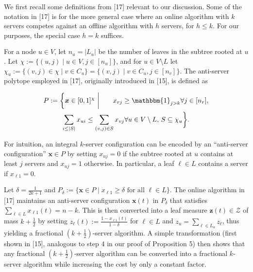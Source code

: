 We first recall some definitions from [17] relevant to our discussion.
Some of the notation in [17] is for the more general case where an online algorithm with $k$ servers competes against an offline algorithm with $h$ servers, for $h\leq k$. For our purposes, the special case $h=k$ suffices.\par




For a node $u\in V$, let $n_{u}=|L_{u}|$ be the number of leaves in the subtree rooted at $u$. Let $\chi:=\{(u,j)\mid u\in V,j\in[n_{u}]\}$, and for $u\in V\setminus L$ let $\chi_{u}:=\{(v,j)\in\chi\mid v\in C_{u}\}=\{(v,j)\mid v\in C_{u},j\in[n_{v}]\}$. The anti-server polytope employed in [17], originally introduced in [15], is defined as\par


\[\begin{gathered}
\displaystyle P:=\bigg\{{\boldsymbol{x}}\in[0,1]^{\chi}\,\,\bigg|\qquad x_{rj} \displaystyle\geq\mathbbm{1}_{j>k} \displaystyle\forall j\in[n_{r}], \\
\displaystyle\sum_{i\leq|S|}x_{ui} \displaystyle\leq\sum_{(v,j)\in S}x_{vj} \displaystyle\forall u\in V\setminus L,\,S\subseteq\chi_{u}\bigg\}.
\end{gathered}\]


For intuition, an integral $k$-server configuration can be encoded by an “anti-server configuration” ${\boldsymbol{x}}\in P$ by setting $x_{uj}=0$ if the subtree rooted at $u$ contains at least $j$ servers and $x_{uj}=1$ otherwise. In particular, a leaf $\ell\in L$ contains a server if $x_{\ell 1}=0$.\par




Let $\delta=\frac{1}{2k+1}$ and $P_{\delta}:=\{{\boldsymbol{x}}\in P\mid x_{\ell 1}\geq\delta\text{ for all }\ell\in L\}$. The online algorithm in [17] maintains an anti-server configuration ${\boldsymbol{x}}(t)$ in $P_{\delta}$ that satisfies $\sum_{\ell\in L}x_{\ell 1}(t)=n-k$. This is then converted into a leaf measure ${\mathbf{z}}(t)\in\mathcal{Z}$ of mass $k+\frac{1}{2}$ by setting $z_{\ell}(t):=\frac{1-x_{\ell 1}(t)}{1-\delta}$ for $\ell\in L$ and $z_{u}=\sum_{\ell\in L_{u}}z_{\ell}$, thus yielding a fractional $\left(k+\frac{1}{2}\right)$-server algorithm. A simple transformation (first shown in [15], analogous to step 4 in our proof of Proposition 5) then shows that any fractional $\left(k+\frac{1}{2}\right)$-server algorithm can be converted into a fractional $k$-server algorithm while increasing the cost by only a constant factor.\par




